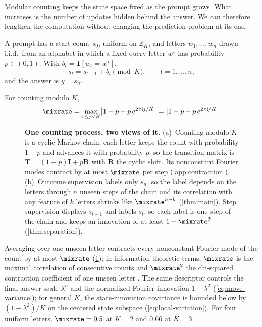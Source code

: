 Modular counting keeps the state space fixed as the prompt grows. What increases is the number of updates hidden behind the
answer. We can therefore lengthen the computation without changing the prediction problem at its end.

\begin{definition}
\label{def:task}
A prompt has a start count $s_0$, uniform on $\mathbb Z_K$, and letters $w_1,\ldots,w_n$ drawn i.i.d.\ from an alphabet
in which a fixed query letter $w^\star$ has probability $p\in(0,1)$. With $b_t=\mathbf 1[w_t=w^\star]$,
\begin{equation}
 s_t=s_{t-1}+b_t\pmod K,\qquad t=1,\ldots,n,
 \label{eq:tracking}
\end{equation}
and the answer is $y=s_n$.
\end{definition}

\begin{definition}
\label{def:lambda}
For counting modulo $K$,
\begin{equation}
 \mixrate=\max_{1\le j<K}\bigl|1-p+p\,e^{2\pi\mathrm ij/K}\bigr|=\bigl|1-p+p\,e^{2\pi\mathrm i/K}\bigr|.
 \label{eq:lambda}
\end{equation}
\end{definition}

\begin{figure}[t]
\centering
\resizebox{\linewidth}{!}{}
\caption{\textbf{One counting process, two views of it.}
(a)~Counting modulo $K$ is a cyclic Markov chain: each letter keeps the count with probability $1-p$ and advances it with probability
$p$, so the transition matrix is $\mathbf T=(1-p)\mathbf I+p\mathbf R$ with $\mathbf R$ the cyclic shift. Its nonconstant Fourier modes
contract by at most $\mixrate$ per step (\cref{app:contraction}).
(b)~Outcome supervision labels only $s_n$, so the label depends on the letters through $n$ unseen steps of the chain and its
correlation with any feature of $k$ letters shrinks like $\mixrate^{n-k}$ (\cref{thm:main}). Step supervision displays $s_{t-1}$ and labels $s_t$, so each label is one
step of the chain and keeps an innovation of at least $1-\mixrate^2$ (\cref{thm:separation}).}
\label{fig:chain}
\end{figure}

Averaging over one unseen letter contracts every nonconstant Fourier mode of the count by at most $\mixrate$ (\cref{fig:chain}); in information-theoretic terms,
$\mixrate$ is the maximal correlation of consecutive counts and $\mixrate^2$ the chi-squared contraction coefficient of one
unseen letter \citep{witsenhausen1975sequences,raginsky2016strong}.
The same descriptor controls the final-answer scale $\lambda^n$ and the
normalized Fourier innovation $1-\lambda^2$ (\cref{eq:move-variance}); for general
$K$, the state-innovation covariance is bounded below by
$(1-\lambda^2)/K$ on the centered state subspace (\cref{eq:local-variation}).
For four uniform letters,
$\mixrate=0.5$ at $K=2$ and $0.66$ at $K=3$.

